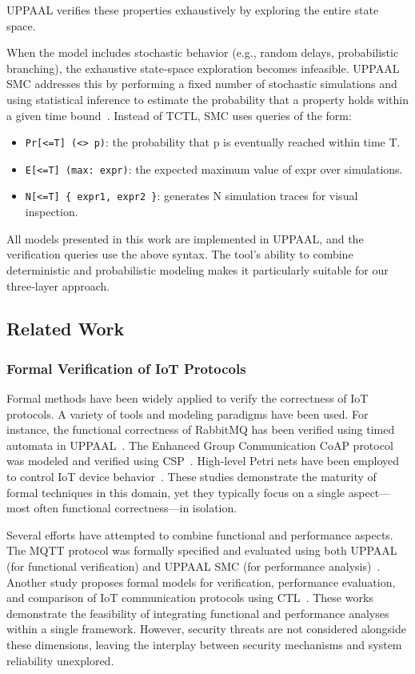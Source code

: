 \documentclass[a4paper,fleqn]{cas-sc}
\begin{document}
UPPAAL verifies these properties exhaustively by exploring the entire state space.

When the model includes stochastic behavior (e.g., random delays, probabilistic branching), the exhaustive state‑space exploration becomes infeasible. UPPAAL SMC addresses this by performing a fixed number of stochastic simulations and using statistical inference to estimate the probability that a property holds within a given time bound~\cite{david2015uppaal}. Instead of TCTL, SMC uses queries of the form:
\begin{itemize}
    \item \texttt{Pr[<=T] (<> p)}: the probability that p is eventually reached within time T.
    \item \texttt{E[<=T] (max: expr)}: the expected maximum value of expr over simulations.
    \item \texttt{N[<=T] \{ expr1, expr2 \}}: generates N simulation traces for visual inspection.
\end{itemize}

All models presented in this work are implemented in UPPAAL, and the verification queries use the above syntax. The tool’s ability to combine deterministic and probabilistic modeling makes it particularly suitable for our three‑layer approach.

\subsection{Related Work}
\subsubsection{Formal Verification of IoT Protocols}
Formal methods have been widely applied to verify the correctness of IoT protocols. A variety of tools and modeling paradigms have been used. For instance, the functional correctness of RabbitMQ has been verified using timed automata in UPPAAL~\cite{DBLP:conf/trustcom/LiYZ20}. The Enhanced Group Communication CoAP protocol was modeled and verified using CSP~\cite{DBLP:journals/ijseke/ChenLZ24}. High‑level Petri nets have been employed to control IoT device behavior~\cite{DASILVAFONSECA20231462}. These studies demonstrate the maturity of formal techniques in this domain, yet they typically focus on a single aspect—most often functional correctness—in isolation.

Several efforts have attempted to combine functional and performance aspects. The MQTT protocol was formally specified and evaluated using both UPPAAL (for functional verification) and UPPAAL SMC (for performance analysis)~\cite{houimli2017formal}. Another study proposes formal models for verification, performance evaluation, and comparison of IoT communication protocols using CTL~\cite{hafaiedh2022formal}. These works demonstrate the feasibility of integrating functional and performance analyses within a single framework. However, security threats are not considered alongside these dimensions, leaving the interplay between security mechanisms and system reliability unexplored.
\end{document}
